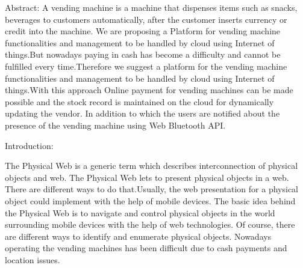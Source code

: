 \documentclass[oneside,a4paper,12pt]{report}
\begin{document}
Abstract:
A vending machine is a machine that dispenses items such  as snacks, beverages to customers automatically, after the customer inserts currency or credit into the machine. We are proposing a Platform for vending machine functionalities and management to be  handled by cloud using Internet of things.But nowadays paying in cash has become a difficulty and cannot be fulfilled every time.Therefore we suggest a platform for the vending machine functionalities and management to be  handled by cloud using Internet of things.With this approach Online payment for vending machines can be made possible and the stock record is maintained on the cloud for dynamically updating the vendor. In addition to which the users are notified about the presence of the vending machine using Web Bluetooth API.

Introduction:

 The Physical Web is a generic term which describes interconnection of physical objects and web. The Physical Web lets to present physical objects in a web. There are different ways to do that.Usually, the web presentation for a physical object could implement with the help
of mobile devices. The basic idea behind the Physical Web is to navigate and control physical objects in the world surrounding
mobile devices with the help of web technologies. Of course, there are different ways to identify and enumerate physical objects.
Nowadays operating the vending machines has been difficult due to cash payments and location issues.
\end{document}
